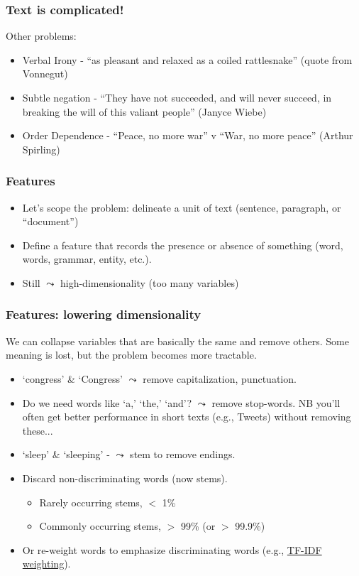 \documentclass[]{beamer}
\begin{document}
\begin{frame}
  \frametitle{Text is complicated!}   %
Other problems:  
\begin{itemize}
  \item Verbal Irony - ``as pleasant and relaxed as a coiled rattlesnake'' (quote from Vonnegut)
  \item Subtle negation - ``They have not succeeded, and will never succeed, in
breaking the will of this valiant people'' (Janyce Wiebe)
  \item Order Dependence - ``Peace, no more war'' v ``War, no more peace'' (Arthur Spirling)
  \end{itemize}
\end{frame}


\begin{frame}
  \frametitle{Features}   %
  \begin{itemize}
  \item Let's scope the problem: delineate a unit of text (sentence, paragraph, or ``document'')
  \item Define a feature that records the presence or absence of something (word, words, grammar, entity, etc.).
  \item Still $\leadsto$ high-dimensionality (too many variables)
  \end{itemize}
\end{frame}

\begin{frame}
  \frametitle{Features: lowering dimensionality}   %
  We can collapse variables that are basically the same and remove others.  Some meaning is lost, but the problem becomes more tractable.  
  \begin{itemize}
  \item `congress' \& `Congress' $\leadsto$ remove capitalization, punctuation.
  \item Do we need words like `a,' `the,' `and'?   $\leadsto$ remove stop-words. NB you'll often get better performance in short texts (e.g., Tweets) without removing these...
  \item `sleep' \& `sleeping' - $\leadsto$ stem to remove endings.
  \item Discard non-discriminating words (now stems).  
    \begin{itemize}
    \item Rarely occurring stems, $<$  1\%
    \item Commonly occurring stems, $>$  99\% (or $>$  99.9\%)
  \end{itemize}
  \item Or re-weight words to emphasize discriminating words (e.g., \href{http://nlp.stanford.edu/IR-book/html/htmledition/tf-idf-weighting-1.html}{\color{blue} TF-IDF weighting}).
  \end{itemize}
\end{frame}
\end{document}
